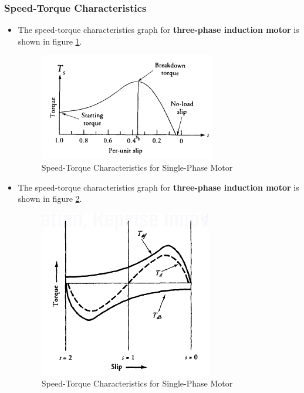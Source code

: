 \documentclass[journal]{IEEEtran}
\begin{document}
\subsubsection{Speed-Torque Characteristics}
\begin{itemize}
    \item The speed-torque characteristics graph for \textbf{three-phase induction motor} is shown in figure \ref{fig:threetor}.
    \begin{figure}[h]
    \centering
    \includegraphics[scale=0.6]{Induction/three_torque.PNG}
    \caption{Speed-Torque Characteristics for Single-Phase Motor \cite{guru2007}}
    \label{fig:threetor}
    \end{figure}
    
    \item The speed-torque characteristics graph for \textbf{three-phase induction motor} is shown in figure \ref{fig:singletor}.
    \begin{figure}[h]
    \centering
    \includegraphics[scale=0.55]{Induction/single_torque.PNG}
    \caption{Speed-Torque Characteristics for Single-Phase Motor \cite{guru2007}}
    \label{fig:singletor}
    \end{figure}
    
\end{itemize}
\end{document}
